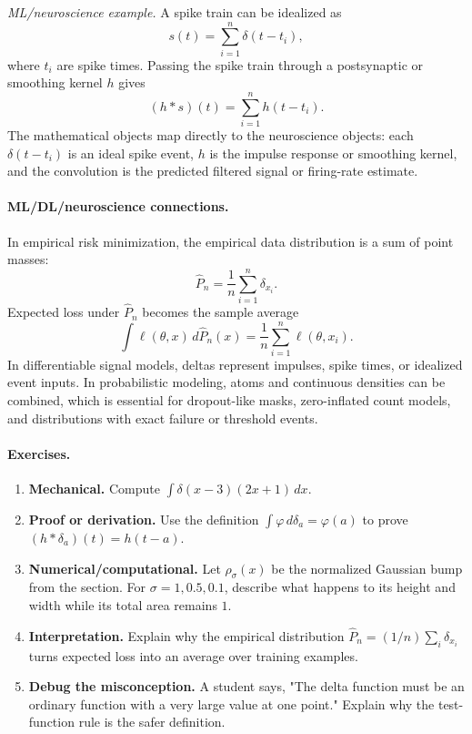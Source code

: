 \emph{ML/neuroscience example.} A spike train can be idealized as
\[
s(t)=\sum_{i=1}^n \delta(t-t_i),
\]
where \(t_i\) are spike times. Passing the spike train through a postsynaptic or smoothing kernel \(h\) gives
\[
(h*s)(t)=\sum_{i=1}^n h(t-t_i).
\]
The mathematical objects map directly to the neuroscience objects: each \(\delta(t-t_i)\) is an ideal spike event, \(h\) is the impulse response or smoothing kernel, and the convolution is the predicted filtered signal or firing-rate estimate.

\paragraph{ML/DL/neuroscience connections.}
In empirical risk minimization, the empirical data distribution is a sum of point masses:
\[
\widehat{P}_n=\frac{1}{n}\sum_{i=1}^n\delta_{x_i}.
\]
Expected loss under \(\widehat{P}_n\) becomes the sample average
\[
\int \ell(\theta,x)\,d\widehat{P}_n(x)
=
\frac{1}{n}\sum_{i=1}^n\ell(\theta,x_i).
\]
In differentiable signal models, deltas represent impulses, spike times, or idealized event inputs. In probabilistic modeling, atoms and continuous densities can be combined, which is essential for dropout-like masks, zero-inflated count models, and distributions with exact failure or threshold events.

\paragraph{Exercises.}
\begin{enumerate}[label=\textbf{11.4.\arabic*.}, leftmargin=*]
\item \textbf{Mechanical.} Compute \(\int \delta(x-3)(2x+1)\,dx\).
\item \textbf{Proof or derivation.} Use the definition \(\int \varphi\,d\delta_a=\varphi(a)\) to prove \((h*\delta_a)(t)=h(t-a)\).
\item \textbf{Numerical/computational.} Let \(\rho_\sigma(x)\) be the normalized Gaussian bump from the section. For \(\sigma=1,0.5,0.1\), describe what happens to its height and width while its total area remains \(1\).
\item \textbf{Interpretation.} Explain why the empirical distribution \(\widehat{P}_n=(1/n)\sum_i\delta_{x_i}\) turns expected loss into an average over training examples.
\item \textbf{Debug the misconception.} A student says, "The delta function must be an ordinary function with a very large value at one point." Explain why the test-function rule is the safer definition.
\end{enumerate}

